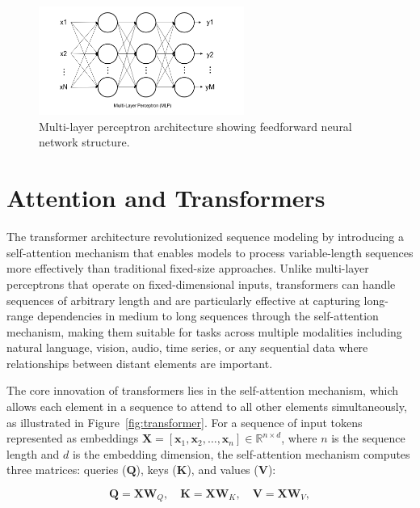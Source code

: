 \begin{figure}[htbp]
\centering
\includegraphics[width=0.6\textwidth]{Images/mlp.png}
\caption{Multi-layer perceptron architecture showing feedforward neural network structure.}
\label{fig:mlp}
\end{figure}

\section{Attention and Transformers}

The transformer architecture revolutionized sequence modeling by introducing a self-attention mechanism that enables models to process variable-length sequences more effectively than traditional fixed-size approaches. Unlike multi-layer perceptrons that operate on fixed-dimensional inputs, transformers can handle sequences of arbitrary length and are particularly effective at capturing long-range dependencies in medium to long sequences through the self-attention mechanism, making them suitable for tasks across multiple modalities including natural language, vision, audio, time series, or any sequential data where relationships between distant elements are important.

The core innovation of transformers lies in the self-attention mechanism, which allows each element in a sequence to attend to all other elements simultaneously, as illustrated in Figure~\ref{fig:transformer}. For a sequence of input tokens represented as embeddings $\mathbf{X} = [\mathbf{x}_1, \mathbf{x}_2, \ldots, \mathbf{x}_n] \in \mathbb{R}^{n \times d}$, where $n$ is the sequence length and $d$ is the embedding dimension, the self-attention mechanism computes three matrices: queries ($\mathbf{Q}$), keys ($\mathbf{K}$), and values ($\mathbf{V}$):

\begin{equation}
\mathbf{Q} = \mathbf{X}\mathbf{W}_Q, \quad \mathbf{K} = \mathbf{X}\mathbf{W}_K, \quad \mathbf{V} = \mathbf{X}\mathbf{W}_V,
\end{equation}

